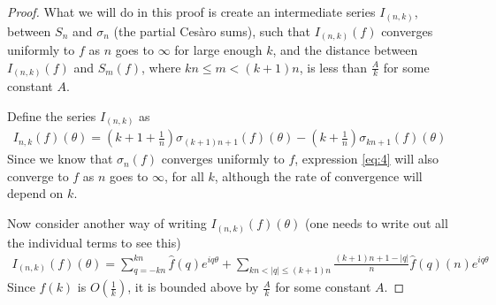 \documentclass[12pt, titlepage]{article}
\theoremstyle{definition}
\begin{document}
\begin{proof}
    What we will do in this proof is create an intermediate series $I_{(n,k)}$, between $S_n$ and $\sigma_n$ (the partial Cesàro sums), such  that $I_{(n,k)}(f)$ converges uniformly to $f$ as $n$ goes to $\infty$ for large enough $k$, and the distance between $I_{(n,k)}(f)$ and $S_m(f)$, where $kn \leq m < (k+1)n$, is less than $\frac{A}{k}$ for some constant $A$.
    
    Define the series $I_{(n,k)}$ as
    \begin{align}
        I_{n,k}(f)(\theta) = \left( k+1 + \frac{1}{n} \right)\sigma_{(k+1)n + 1}(f)(\theta) - \left( k + \frac{1}{n} \right)\sigma_{kn + 1}(f)(\theta) \label{eq:4}
    \end{align}
    Since we know that $\sigma_n(f)$ converges uniformly to $f$, expression \ref{eq:4} will also converge to $f$ as $n$ goes to $\infty$, for all $k$, although the rate of convergence will depend on $k$.
    
    Now consider another way of writing $I_{(n,k)}(f)(\theta)$ (one needs to write out all the individual terms to see this)
    \begin{align*}
        I_{(n,k)}(f)(\theta) = \sum_{q=-kn}^{kn} \widehat{f}(q) e^{iq\theta} + \sum_{kn < |q| \leq (k+1)n} \frac{(k+1)n + 1 - |q|}{n} \widehat{f}(q)(n) e^{iq\theta}
    \end{align*}
    Since $\widehat{f}(k)$ is $O\left( \frac{1}{k} \right)$, it is bounded above by $\frac{A}{k}$ for some constant $A$.
    

\end{proof}
\end{document}
